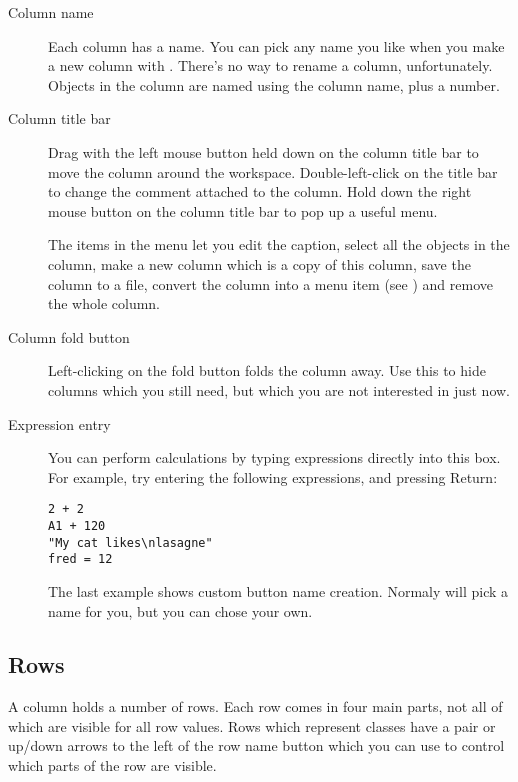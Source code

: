 \begin{description}

\item[Column name]
Each column has a name. You can pick any name you like when you make a new
column with . There's no way to rename a column,
unfortunately. Objects in the column are named using the column name,
plus a number.

\item[Column title bar]
Drag with the left mouse button held down on the column title bar to move
the column around the workspace. Double-left-click on the title bar to
change the comment attached to the column. Hold down the right mouse button
on the column title bar to pop up a useful menu. 

The items in the menu let you edit the caption, select all the objects
in the column, make a new column which is a copy of this column, save the
column to a file, convert the column into a menu item
(see ) and remove the whole column.

\item[Column fold button]
Left-clicking on the fold button folds the column away. Use this to hide
columns which you still need, but which you are not interested in just now.

\item[Expression entry]
You can perform calculations by typing expressions directly into this box. For
example, try entering the following expressions, and pressing Return:

\begin{verbatim}
2 + 2
A1 + 120
"My cat likes\nlasagne"
fred = 12
\end{verbatim}

\noindent
The last example shows custom button name creation. Normaly \nip{} will pick a
name for you, but you can chose your own.

\end{description}

\subsection{Rows}

A column holds a number of rows. Each row comes in four main parts, not all of
which are visible for all row values. Rows which represent classes have a pair
or up/down arrows to the left of the row name button which you can use to
control which parts of the row are visible.

